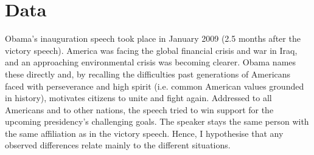\documentclass[11pt]{article}
\begin{document}
\section{Data}{
	Obama's inauguration speech took place in January 2009 (2.5 months after the victory speech).
	America was facing the global financial crisis and war in Iraq, and an approaching environmental crisis was becoming clearer.
	Obama names these directly and, by recalling the difficulties past generations of Americans faced with perseverance and high spirit (i.e. common American values grounded in history), 
	motivates citizens to unite and fight again.
	Addressed to all Americans and to other nations, the speech tried to win support for the upcoming presidency's challenging goals.
	The speaker stays the same person with the same affiliation as in the victory speech. Hence, I hypothesise that any observed differences relate mainly to the different situations.

}
\end{document}
